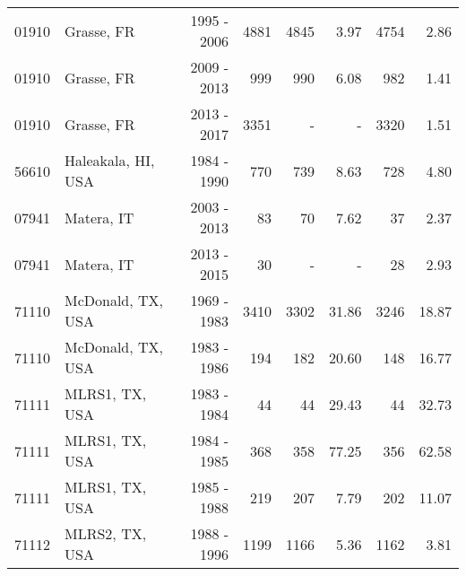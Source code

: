 \documentclass[fleqn,usenatbib,referee]{mnras}
\begin{document}
\begin{table*}
\begin{tabular}{clrrrrrr}
    01910         & Grasse, FR                                 & 1995 - 2006                              &  4881             & 4845      & 3.97     &  4754         &  2.86        \\ %
    01910         & Grasse, FR                                 & 2009 - 2013                              &  999              & 990       & 6.08     & 982           &  1.41        \\ %
    01910         & Grasse, FR                                 & 2013 - 2017                              &  3351             &  -        &  -       & 3320          &  1.51        \\ 
    56610         & Haleakala, HI, USA                         & 1984 - 1990                        &  770              & 739       & 8.63     & 728           &  4.80        \\ 
    07941         & Matera, IT                                 & 2003 - 2013                               &  83               & 70        & 7.62     & 37            &  2.37        \\ 
    07941         & Matera, IT                                 & 2013 - 2015                               &  30               &  -        & -        & 28            &  2.93        \\ 
    71110         & McDonald, TX, USA                          & 1969 - 1983                     &  3410             & 3302      & 31.86    & 3246          &  18.87       \\ 
    71110         & McDonald, TX, USA                          & 1983 - 1986                     &  194              & 182       & 20.60    & 148           &  16.77       \\ 
    71111         & MLRS1, TX, USA                             & 1983 - 1984                      &  44               & 44        & 29.43    & 44            &  32.73       \\
    71111         & MLRS1, TX, USA                             & 1984 - 1985                      &  368              & 358       & 77.25    & 356           &  62.58       \\
    71111         & MLRS1, TX, USA                             & 1985 - 1988                      &  219              & 207       & 7.79     & 202           &  11.07       \\ 
    71112         & MLRS2, TX, USA                             & 1988 - 1996                      &  1199             & 1166      & 5.36     & 1162          &  3.81        \\ 

\end{tabular}
\end{table*}
\end{document}
